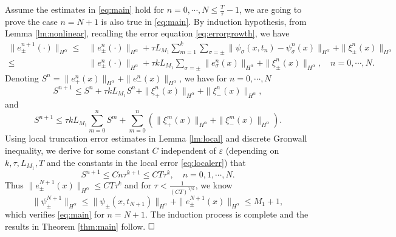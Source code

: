 \documentclass[final,leqno,showlabe]{siamltex}
\begin{document}
Assume the estimates in \eqref{eq:main} hold for $n=0,\cdots, N\leq\frac{T}{\tau}-1$,  we are going to prove the case $n=N+1$ is also true in \eqref{eq:main}. By induction hypothesis, from Lemma \ref{lm:nonlinear},  recalling the error equation \eqref{eq:errorgrowth}, we have
\begin{align*}
\|e_\pm^{n+1}(\cdot)\|_{H^\alpha}\leq &\|e_\pm^n(\cdot)\|_{H^\alpha}+\tau L_{M_1}\sum\limits_{m=1}^k\sum\limits_{\sigma=\pm}\|\psi_\sigma(x,t_n)-\psi_\sigma^n(x)\|_{H^\alpha}+\|\xi_\pm^n(x)\|_{H^\alpha}\\
 \leq &\|e_\pm^n(\cdot)\|_{H^\alpha}+\tau kL_{M_1}\sum\limits_{\sigma=\pm}\|e_\sigma^n(x)\|_{H^\alpha}+\|\xi_\pm^n(x)\|_{H^\alpha},\quad n=0,\cdots,N.
\end{align*}
Denoting $S^n=\|e_+^n(x)\|_{H^\alpha}+\|e_-^n(x)\|_{H^\alpha}$, we have for $n=0,\cdots,N$
\begin{equation}
S^{n+1}\leq S^n+\tau kL_{M_1}S^n+\|\xi_+^n(x)\|_{H^\alpha}+\|\xi_-^n(x)\|_{H^\alpha},
\end{equation}
and
\begin{equation}
S^{n+1}\leq \tau kL_{M_1}\sum\limits_{m=0}^nS^m+\sum_{m=0}^n\left(\|\xi_+^m(x)\|_{H^\alpha}+\|\xi_-^m(x)\|_{H^\alpha}\right).
\end{equation}
Using local truncation error estimates in Lemma \ref{lm:local} and discrete Gronwall  inequality, we derive for some constant  $C$ independent of $\varepsilon$ (depending on $k,\tau,L_{M_1},T$ and the constants in the local error \eqref{eq:localerr}) that
\begin{equation}
S^{n+1}\leq C n\tau^{k+1}\leq CT\tau^k,\quad n=0,1,\cdots,N.
\end{equation}
Thus $\|e_\pm^{N+1}(x)\|_{H^\alpha}\leq CT\tau^k$ and for $\tau<\frac{1}{(CT)^{1/k}}$, we know
\begin{equation}
\|\psi_\pm^{N+1}\|_{H^\alpha}\leq \|\psi_\pm(x,t_{N+1})\|_{H^\alpha}+\|e_\pm^{N+1}(x)\|_{H^\alpha}
\leq M_1+1,
\end{equation}
which verifies \eqref{eq:main} for $n=N+1$. The induction process is complete and the results in Theorem \ref{thm:main} follow.
$\hfill\Box$
\end{document}
